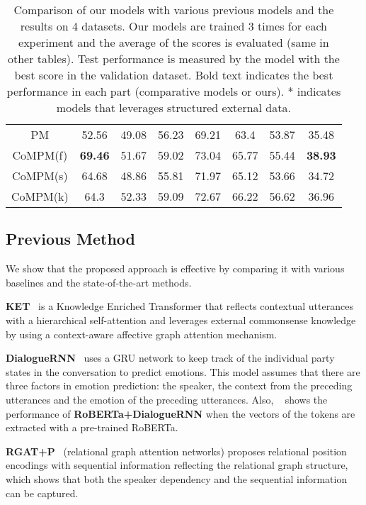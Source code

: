 \documentclass[11pt]{article}
\begin{document}
\begin{table*}[!t]
{\begin{tabular}{c|c|cc|cc|cc}
PM                      & 52.56          & 49.08           & 56.23          & 69.21            & 63.4             & 53.87            & 35.48            \\
CoMPM(f)                 & \textbf{69.46} & 51.67      & 59.02          & 73.04            & 65.77            & 55.44            & \textbf{38.93}   \\ 
CoMPM(s)                 & 64.68 & 48.86      & 55.81          & 71.97            & 
65.12            & 53.66            & 34.72   \\
CoMPM(k)                 & 64.3 & 52.33      & 59.09          & 72.67            & 66.22            & 56.62            & 36.96   \\ \hline
\end{tabular}
}
\caption{Comparison of our models with various previous models and the results on 4 datasets. Our models are trained 3 times for each experiment and the average of the scores is evaluated (same in other tables). Test performance is measured by the model with the best score in the validation dataset. Bold text indicates the best performance in each part (comparative models or ours). * indicates models that leverages structured external data.}
\label{Tab:results}
\end{table*}

\subsection{Previous Method}
We show that the proposed approach is effective by comparing it with various baselines and the state-of-the-art methods.


\textbf{KET}~\cite{zhong-etal-2019-knowledge} is a Knowledge Enriched Transformer that reflects contextual utterances with a hierarchical self-attention and leverages external commonsense knowledge by using a context-aware affective graph attention mechanism.


\textbf{DialogueRNN}~\cite{DialogueRNN} uses a GRU network to keep track of the individual party states in the conversation to predict emotions. This model assumes that there are three factors in emotion prediction: the speaker, the context from the preceding utterances and the emotion of the preceding utterances. Also, ~\citet{ghosal-etal-2020-cosmic} shows the performance of \textbf{RoBERTa+DialogueRNN} when the vectors of the tokens are extracted with a pre-trained RoBERTa.


\textbf{RGAT+P}~\cite{ishiwatari-etal-2020-relation} (relational graph attention networks) proposes relational position encodings with sequential information reflecting the relational graph structure, which shows that both the speaker dependency and the sequential information can be captured.
\end{document}
